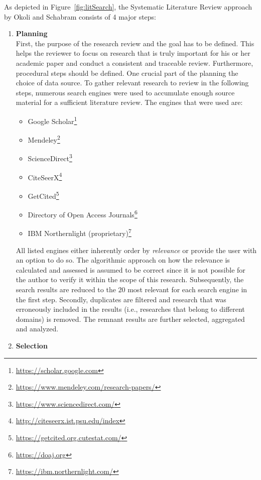 As depicted in Figure~\vref{fig:litSearch}, the Systematic Literature Review approach by Okoli and Schabram consists of 4 major steps: \\
\begin{enumerate}
    \item
    \textbf{Planning}\\
    First, the purpose of the research review and the goal has to be defined. This helps the reviewer to focus on research that is truly important for his or her academic paper and conduct a consistent and traceable review. Furthermore, procedural steps should be defined. One crucial part of the planning the choice of data source. To gather relevant research to review in the following steps, numerous search engines were used to accumulate enough source material for a sufficient literature review. The engines that were used are: 
    \begin{itemize}
        \renewcommand\labelitemi{--}
        \item Google Scholar\footnote{\url{https://scholar.google.com}}
        \item Mendeley\footnote{\url{https://www.mendeley.com/research-papers/}}
        \item ScienceDirect\footnote{\url{https://www.sciencedirect.com/}}
        \item CiteSeerX\footnote{\url{http://citeseerx.ist.psu.edu/index}}
        \item GetCited\footnote{\url{https://getcited.org.cutestat.com/}}
        \item Directory of Open Access Journals\footnote{\url{https://doaj.org}}
        \item IBM Northernlight (proprietary)\footnote{\url{https://ibm.northernlight.com/}}
    \end{itemize}
    All listed engines either inherently order by \textit{relevance} or provide the user with an option to do so. The algorithmic approach on how the relevance is calculated and assessed is assumed to be correct since it is not possible for the author to verify it within the scope of this research. Subsequently, the search results are reduced to the $20$ most relevant for each search engine in the first step. Secondly, duplicates are filtered and research that was erroneously included in the results (i.e., researches that belong to different domains) is removed. The remnant results are further selected, aggregated and analyzed.
    \item
    \textbf{Selection}\\

\end{enumerate}

